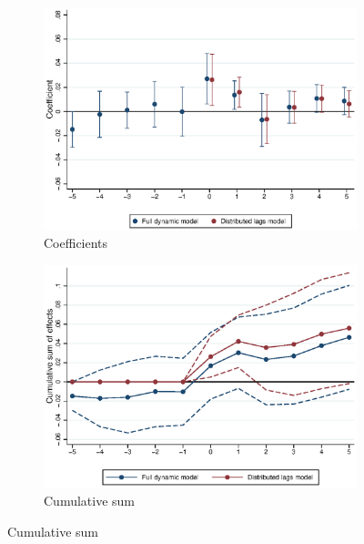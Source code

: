 \begin{figure}
    \caption{Results of main dynamic model} %
    \label{fig:fd_models_main}
    \centering
    \begin{subfigure}[b]{0.8\textwidth}
    	\caption{Coefficients}
    	\includegraphics[width = \textwidth]
    	{../../analysis/first_differences/output/fd_models_coeffs_w5.eps}
    \end{subfigure}
    \begin{subfigure}[b]{0.8\textwidth}
    	\caption{Cumulative sum}
    	\includegraphics[width = \textwidth]
    	{../../analysis/first_differences/output/fd_models_cumsum.eps}
    \end{subfigure}
    \begin{minipage}{0.95\textwidth} \footnotesize
		\vspace{2mm} 

\end{minipage}
\end{figure}
